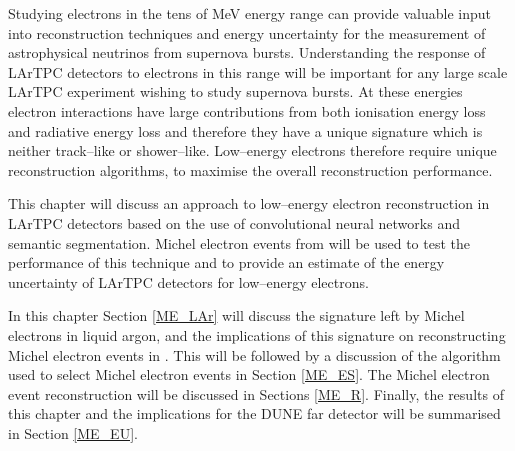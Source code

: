 % 
%
\noindent
Studying electrons in the tens of MeV energy range can provide valuable input 
into reconstruction techniques and energy uncertainty for the measurement of
astrophysical neutrinos from supernova bursts. Understanding the response of
LArTPC detectors to electrons in this range will be important for any large
scale LArTPC experiment wishing to study supernova bursts. At these energies
electron interactions have large contributions from both ionisation energy loss
and radiative energy loss and therefore they have a unique signature which is 
neither track--like or shower--like. Low--energy electrons therefore require 
unique reconstruction algorithms, to maximise the overall reconstruction 
performance. 

This chapter will discuss an approach to low--energy electron reconstruction 
in LArTPC detectors based on the use of convolutional neural networks and 
semantic segmentation. Michel electron events from \protodune{} will be used 
to test the performance of this technique and to provide an estimate of the 
energy uncertainty of LArTPC detectors for low--energy electrons.

In this chapter Section \ref{ME_LAr} will discuss the signature left by Michel
electrons in liquid argon, and the implications of this signature on
reconstructing Michel electron events in \protodune{}. This will be followed by
a discussion of the algorithm used to select Michel electron events in Section
\ref{ME_ES}. The Michel electron event reconstruction will be discussed in
Sections \ref{ME_R}. Finally, the results of this chapter and the implications
for the DUNE far detector will be summarised in Section \ref{ME_EU}.

